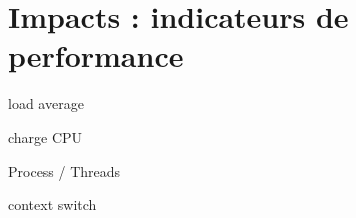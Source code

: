 \section{Impacts : indicateurs de performance}
\begin{frame}
	\begin{block}{load average}
	\end{block}
	\begin{block}{charge CPU}
	\end{block}
\begin{block}{Process / Threads}
	\end{block}
\end{frame}

\begin{frame}
	\begin{block}{context switch}
	\end{block}
\end{frame}

\begin{frame}

\end{frame}

